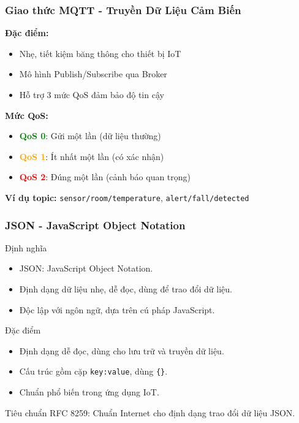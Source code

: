 \begin{frame}
\frametitle{Giao thức MQTT - Truyền Dữ Liệu Cảm Biến}

\textbf{Đặc điểm:}
\begin{itemize}
\item Nhẹ, tiết kiệm băng thông cho thiết bị IoT
\item Mô hình Publish/Subscribe qua Broker
\item Hỗ trợ 3 mức QoS đảm bảo độ tin cậy
\end{itemize}

\textbf{Mức QoS:}
\begin{itemize}
\item \textcolor{green}{\textbf{QoS 0}}: Gửi một lần (dữ liệu thường)
\item \textcolor{orange}{\textbf{QoS 1}}: Ít nhất một lần (có xác nhận)
\item \textcolor{red}{\textbf{QoS 2}}: Đúng một lần (cảnh báo quan trọng)
\end{itemize}

\textbf{Ví dụ topic:} \texttt{sensor/room/temperature}, \texttt{alert/fall/detected}
\end{frame}


\begin{frame}
\frametitle{JSON - JavaScript Object Notation}
\begin{block}{Định nghĩa}
\begin{itemize}
\item JSON: JavaScript Object Notation.
\item Định dạng dữ liệu nhẹ, dễ đọc, dùng để trao đổi dữ liệu.
\item Độc lập với ngôn ngữ, dựa trên cú pháp JavaScript.
\end{itemize}
\end{block}

\begin{block}{Đặc điểm}
\begin{itemize}
\item Định dạng dễ đọc, dùng cho lưu trữ và truyền dữ liệu.
\item Cấu trúc gồm cặp \texttt{key:value}, dùng \texttt{\{\}}.
\item Chuẩn phổ biến trong ứng dụng IoT.
\end{itemize}
\end{block}

\begin{block}{Tiêu chuẩn}
RFC 8259: Chuẩn Internet cho định dạng trao đổi dữ liệu JSON.
\end{block}
\end{frame}

